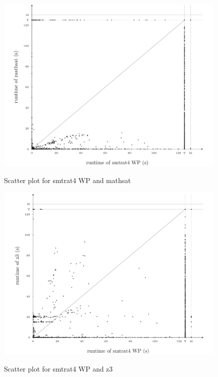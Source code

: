 \begin{figure}[!ht]
    \centering
    \caption{Scatter plot for smtrat4 WP and mathsat}
    \includegraphics[width=1\linewidth]{./figures/scatter-smtrat_4_preprocessing-mathsat.pdf}
  \label{fig:Scatter_plot_for_smtrat4_WP_and_mathsat}
\end{figure}

\begin{figure}[!ht]
    \centering
    \caption{Scatter plot for smtrat4 WP and z3}
    \includegraphics[width=1\linewidth]{./figures/scatter-smtrat_4_preprocessing-z3.pdf}
    \label{fig:Scatter_plot_for_smtrat4_WP_and_z3}
\end{figure}

